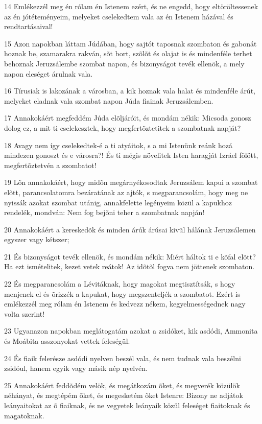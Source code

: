 \par 14 Emlékezzél meg én rólam én Istenem ezért, és ne engedd, hogy eltöröltessenek az én jótéteményeim, melyeket cselekedtem vala az én Istenem házával és rendtartásaival!
\par 15 Azon napokban láttam Júdában, hogy sajtót taposnak szombaton és gabonát hoznak be, szamarakra rakván, sõt bort, szõlõt és olajat is és mindenféle terhet behoznak Jeruzsálembe szombat napon, és bizonyságot tevék ellenök, a mely napon eleséget árulnak vala.
\par 16 Tírusiak is lakozának a városban, a kik hoznak vala halat és mindenféle árút, melyeket eladnak vala szombat napon Júda fiainak Jeruzsálemben.
\par 17 Annakokáért megfeddém Júda elõljáróit, és mondám nékik: Micsoda gonosz dolog ez, a mit ti cselekesztek, hogy megfertõztetitek a szombatnak napját?
\par 18 Avagy nem így cselekedtek-é a ti atyáitok, s a mi Istenünk reánk hozá mindezen gonoszt és e városra?! És ti mégis növelitek Isten haragját Izráel fölött, megfertõztetvén a szombatot!
\par 19 Lõn annakokáért, hogy midõn megárnyékosodtak Jeruzsálem kapui a szombat elõtt, parancsolatomra bezáratának az ajtók, s megparancsolám, hogy meg ne nyissák azokat szombat utánig, annakfelette legényeim közül a kapukhoz rendelék, mondván: Nem fog bejõni teher a szombatnak napján!
\par 20 Annakokáért a kereskedõk és minden árúk árúsai kivül hálának Jeruzsálemen egyszer vagy kétszer;
\par 21 És bizonyságot tevék ellenök, és mondám nékik: Miért háltok ti e kõfal elõtt? Ha ezt ismételitek, kezet vetek reátok! Az idõtõl fogva nem jöttenek szombaton.
\par 22 És megparancsolám a Lévitáknak, hogy magokat megtisztítsák, s hogy menjenek el és õrizzék a kapukat, hogy megszenteljék a szombatot. Ezért is emlékezzél meg rólam én Istenem és kedvezz nékem, kegyelmességednek nagy volta szerint!
\par 23 Ugyanazon napokban meglátogatám azokat a zsidóket, kik asdódi, Ammonita és Moábita asszonyokat vettek feleségül.
\par 24 És fiaik felerésze asdódi nyelven beszél vala, és nem tudnak vala beszélni zsidóul, hanem egyik vagy másik nép nyelvén.
\par 25 Annakokáért feddõdém velök, és megátkozám õket, és megverék közülök néhányat, és megtépém õket, és megesketém õket Istenre: Bizony ne adjátok leányaitokat az õ fiaiknak, és ne vegyetek leányaik közül feleséget fiaitoknak és magatoknak.

